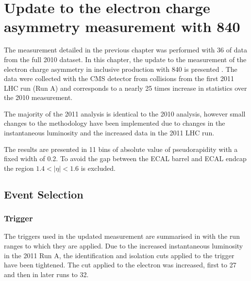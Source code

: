 \chapter[Electron Charge Asymmetry]{Update to the electron charge asymmetry
measurement with \unit{840}{\invpb} }
\label{chap:update}

The measurement detailed in the previous chapter was performed with
\unit{36}{\invpb} of data from the full 2010 dataset. 
In this chapter, the update to the measurement of the electron charge asymmetry in
inclusive \inclusiveWe production with \unit{840}{\invpb} is presented
\cite{asym840,bendavid2011electron}.
The data were collected with the {CMS} detector from collisions from the
first 2011 {LHC} run (Run A) and corresponds to a nearly 25 times increase in
statistics over the 2010 measurement.

The majority of the 2011 analysis is identical to the 2010 analysis,
however small changes to the methodology have been implemented due to changes
in the instantaneous luminosity and the increased data in the 2011 {LHC} run.

The results are presented in 11 bins of absolute value of pseudorapidity with a
fixed width of 0.2. To avoid the gap between the ECAL barrel and ECAL endcap the
region $1.4<|\eta|<1.6$ is excluded.

\section{Event Selection}

\subsection{Trigger}

The triggers used in the updated measurement are summarised in
 with the run ranges to which they are applied.
Due to the increased instantaneous luminosity in the 2011 Run A, the
identification and isolation cuts applied to the trigger have been tightened.
The \PT cut applied to the electron was increased, first to
\unit{27}{\GeV} and then in later runs to \unit{32}{\GeV}. 

